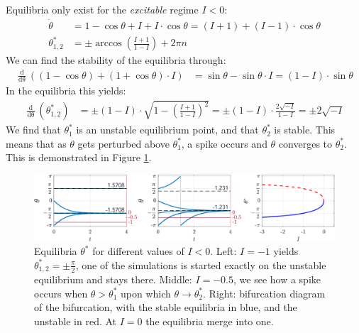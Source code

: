 Equilibria only exist for the \textsl{excitable} regime $I < 0$: 
\begin{align*}
\dot{\theta} &= 1-\cos \theta+I+I \cdot \cos \theta = (I+1)+(I-1) \cdot \cos \theta \\
\theta^{\ast}_{1, 2} &= \pm \arccos \left(\frac{I+1}{1-I}\right)+2 \pi n
\end{align*}
We can find the stability of the equilibria through:
\begin{align*}
\frac{\mathop{d}}{\mathop{d \theta}}((1-\cos \theta)+(1+\cos \theta) \cdot I) &= \sin \theta-\sin \theta \cdot I = (1-I) \cdot \sin \theta
\end{align*}
In the equilibria this yields:
\begin{align*}
\frac{\mathop{d}}{\mathop{d \theta}}\left( \theta^{\ast}_{1, 2} \right) &= \pm(1-I) \cdot \sqrt{1 - \left( \frac{I+1}{1-I} \right)^2 } = \pm(1-I) \cdot \frac{2 \sqrt{-I}}{1-I} = \pm2 \sqrt{-I}
\end{align*}
We find that $\theta^{\ast}_{1}$ is an unstable equilibrium point, and that $\theta^{\ast}_{2}$ is stable. This means that as $\theta$ gets perturbed above $\theta^{\ast}_{1}$, a spike occurs and $\theta$ converges to $\theta^{\ast}_{2}$. This is demonstrated in Figure \ref{fig:ThetaModelEquilibriumPoints}.
\begin{figure}[H]
\centering
\includegraphics[width = \textwidth]{../Figures/ThetaModelEquilibriumPoints.pdf}
\caption{Equilibria $\theta^{\ast}$ for different values of $I < 0$. Left: $I = -1$ yields $\theta^{\ast}_{1,2} = \pm \frac{\pi}{2}$, one of the simulations is started exactly on the unstable equilibrium and stays there. Middle: $I = -0.5$, we see how a spike occurs when $\theta > \theta^{\ast}_{1}$ upon which $\theta \rightarrow \theta^{\ast}_{2}$. Right: bifurcation diagram of the \SNIC bifurcation, with the stable equilibria in blue, and the unstable in red. At $I = 0$ the equilibria merge into one.}
\label{fig:ThetaModelEquilibriumPoints}
\end{figure}


